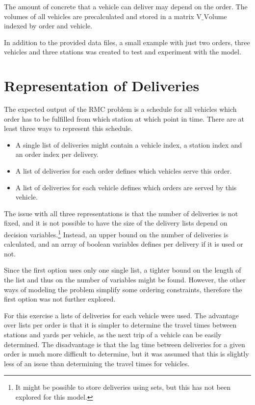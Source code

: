 \documentclass[a4paper]{article}
\newcommand{\VVolume}{\text{V\_Volume}}
\begin{document}
The amount of concrete that a vehicle can deliver may depend on the order. The volumes of all vehicles are precalculated
and stored in a matrix $\VVolume$ indexed by order and vehicle.

\medskip
In addition to the provided data files, a small example with just two orders, three vehicles and three stations was
created to test and experiment with the model.

\section{Representation of Deliveries}

The expected output of the RMC problem is a schedule for all vehicles which order has to be fulfilled from which
station at which point in time. There are at least three ways to represent this schedule. 

\begin{itemize}
\item A single list of deliveries
 might contain a vehicle index, a station index and an order index per delivery.

\item A list of deliveries for each order defines which vehicles serve this order.

\item A list of deliveries for each vehicle defines which orders are served by this vehicle.
\end{itemize}

The issue with all three representations is that the number of deliveries is not fixed, and it is not possible to have
the size of the delivery lists depend on decision variables.\footnote{It might be possible to store deliveries using
sets, but this has not been explored for this model.}
Instead, an upper bound on the number of deliveries is calculated, and an array of boolean variables defines per
delivery if it is used or not.

Since the first option uses only one single list, a tighter bound on the length of the list and thus on the number of
variables might be found. However, the other ways of modeling the problem simplify some ordering constraints, therefore
the first option was not further explored.

For this exercise a lists of deliveries for each vehicle were used. The advantage over lists per order is that it is
simpler to determine the travel times between stations and yards per vehicle, as the next trip of a vehicle can
be easily determined. The disadvantage is that the lag time between deliveries for a given order is much more difficult
to determine, but it was assumed that this is slightly less of an issue than determining the travel times for vehicles.
\end{document}
